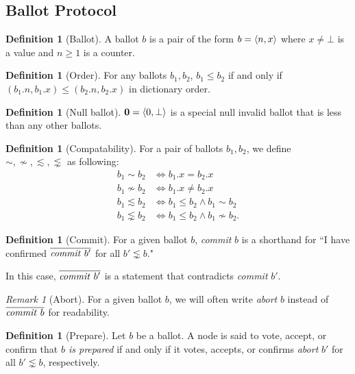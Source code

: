 \documentclass[12pt, psamsfonts]{amsart}
\theoremstyle{definition}
\newtheorem{defn}[thm]{Definition}
\theoremstyle{remark}
\newtheorem{rem}[thm]{Remark}
\newcommand{\textoverline}[1]{$\overline{\mbox{#1}}$}
\numberwithin{equation}{subsection}
\begin{document}
\newpage
\subsection{Ballot Protocol}

\begin{defn}[Ballot]
    A ballot $b$ is a pair of the form $b = \ev{n, x}$ where $x \ne \bot$ is a value and $n \geq 1$ is a counter.
\end{defn}

\begin{defn}[Order]
    For any ballots $b_1, b_2$, $b_1 \leq b_2$ if and only if $(b_1.n, b_1.x) \leq (b_2.n, b_2.x)$ in dictionary order.
\end{defn}

\begin{defn}[Null ballot]
    $\textbf{0} = \ev{0, \bot}$ is a special null invalid ballot that is less than any other ballots.
\end{defn}

\begin{defn}[Compatability]
    For a pair of ballots $b_1, b_2$, we define $\sim, \nsim, \lesssim, \lnsim$ as following:
    \begin{align*}
        b_1 \sim b_2 &\iff b_1.x = b_2.x \\
        b_1 \nsim b_2 &\iff b_1.x \ne b_2.x \\
        b_1 \lesssim b_2 &\iff b_1 \leq b_2 \land b_1 \sim b_2 \\
        b_1 \lnsim b_2 &\iff b_1 \leq b_2 \land b_1 \nsim b_2.
    \end{align*}
\end{defn}

\begin{defn}[Commit]
    For a given ballot $b$, \textit{commit} $b$ is a shorthand for ``I have confirmed \textoverline{\textit{commit} $b'$} for all $b' \lnsim b$."
\end{defn}

In this case, \textoverline{\textit{commit} $b'$} is a statement that contradicts \textit{commit} $b'$.

\begin{rem}[Abort]
    For a given ballot $b$, we will often write \textit{abort} $b$ instead of \textoverline{\textit{commit} $b$} for readability.
\end{rem}

\begin{defn}[Prepare]
    Let $b$ be a ballot.
    A node is said to vote, accept, or confirm that \textit{$b$ is prepared} if and only if it votes, accepts, or confirms \textit{abort} $b'$ for all $b' \lnsim b$, respectively.
\end{defn}
\end{document}
